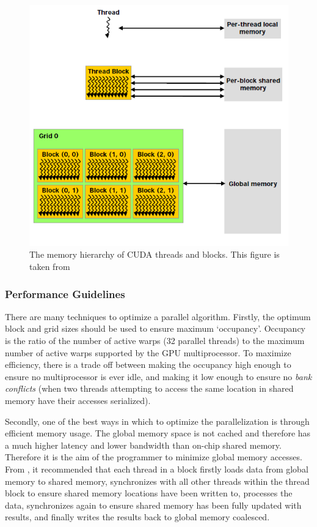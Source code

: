 \begin{figure}[p]
	\centering
		\includegraphics[scale=0.4]{images/cudamemory.PNG}
		\caption{The memory hierarchy of CUDA threads and blocks. This figure is taken from \cite{cuda}}
	\label{fig:cudamemory}
\end{figure}

		\subsubsection{Performance Guidelines}
There are many techniques to optimize a parallel algorithm. Firstly, the optimum block and grid sizes should be used to ensure maximum `occupancy'. Occupancy is the ratio of the number of active warps (32 parallel threads) to the maximum number of active warps supported by the GPU multiprocessor. To maximize efficiency, there is a trade off between making the occupancy high enough to ensure no multiprocessor is ever idle, and making it low enough to ensure no \textit{bank conflicts} (when two threads attempting to access the same location in shared memory have their accesses serialized).

Secondly, one of the best ways in which to optimize the parallelization is through efficient memory usage. The global memory space is not cached and therefore has a much higher latency and lower bandwidth than on-chip shared memory. Therefore it is the aim of the programmer to minimize global memory accesses. From \cite{cuda}, it recommended that each thread in a block firstly loads data from global memory to shared memory, synchronizes with all other threads within the thread block to ensure shared memory locations have been written to, processes the data, synchronizes again to ensure shared memory has been fully updated with results, and finally writes the results back to global memory coalesced.

